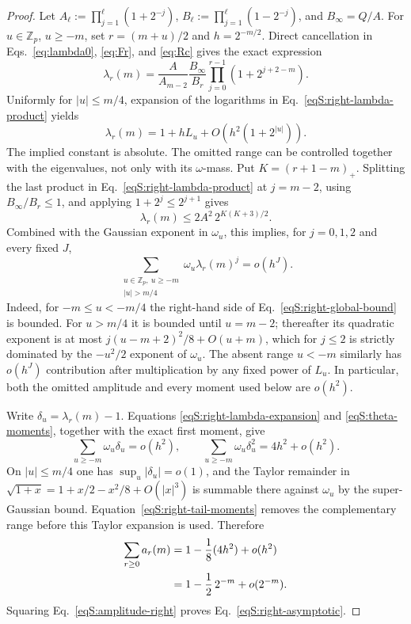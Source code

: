 \documentclass[journal,twocolumn]{IEEEtran}
\theoremstyle{definition}
\theoremstyle{plain}
\begin{document}
\begin{proof}
Let $A_\ell:=\prod_{j=1}^\ell(1+2^{-j})$,
$B_\ell:=\prod_{j=1}^\ell(1-2^{-j})$, and
$B_\infty=Q/A$.  For $u\in\mathbb Z_p$, $u\geq-m$, set
$r=(m+u)/2$ and $h=2^{-m/2}$.  Direct cancellation in
Eqs.~\eqref{eq:lambda0}, \eqref{eq:Fr}, and
\eqref{eq:Rc} gives the exact expression
\begin{equation}
 \lambda_r(m)=
 \frac{A}{A_{m-2}}\frac{B_\infty}{B_r}
 \prod_{j=0}^{r-1}(1+2^{j+2-m}).
 \label{eqS:right-lambda-product}
\end{equation}
Uniformly for $|u|\leq m/4$, expansion of the logarithms in
Eq.~\eqref{eqS:right-lambda-product} yields
\begin{equation}
 \lambda_r(m)=1+hL_u+O\!\left(h^2(1+2^{|u|})\right).
 \label{eqS:right-lambda-expansion}
\end{equation}
The implied constant is absolute.  The omitted range can be controlled
together with the eigenvalues, not only with its $\omega$-mass.  Put
$K=(r+1-m)_+$.  Splitting the last product in
Eq.~\eqref{eqS:right-lambda-product} at $j=m-2$, using
$B_\infty/B_r\leq1$, and applying $1+2^j\leq2^{j+1}$ gives
\begin{equation}
 \lambda_r(m)\leq2A^2\,2^{K(K+3)/2}.
 \label{eqS:right-global-bound}
\end{equation}
Combined with the Gaussian exponent in $\omega_u$, this implies, for
$j=0,1,2$ and every fixed $J$,
\begin{equation}
 \sum_{\substack{u\in\mathbb Z_p,\ u\geq-m\\ |u|>m/4}}
 \omega_u\lambda_r(m)^j=o(h^J).
 \label{eqS:right-tail-moments}
\end{equation}
Indeed, for $-m\leq u<-m/4$ the right-hand side of
Eq.~\eqref{eqS:right-global-bound} is bounded.  For $u>m/4$ it is bounded
until $u=m-2$; thereafter its quadratic exponent is at most
$j(u-m+2)^2/8+O(u+m)$, which for $j\leq2$ is strictly dominated by the
$-u^2/2$ exponent of $\omega_u$.  The absent range $u<-m$ similarly has
$o(h^J)$ contribution after multiplication by any fixed power of $L_u$.
In particular, both the omitted amplitude and every moment used below are
$o(h^2)$.

Write $\delta_u=\lambda_r(m)-1$.  Equations
\eqref{eqS:right-lambda-expansion} and \eqref{eqS:theta-moments}, together
with the exact first moment, give
\begin{equation}
 \sum_{u\geq-m}\omega_u\delta_u=o(h^2),\qquad
 \sum_{u\geq-m}\omega_u\delta_u^2=4h^2+o(h^2).
 \label{eqS:right-delta-moments}
\end{equation}
On $|u|\leq m/4$ one has $\sup_u|\delta_u|=o(1)$, and the Taylor remainder
in $\sqrt{1+x}=1+x/2-x^2/8+O(|x|^3)$ is summable there against
$\omega_u$ by the super-Gaussian bound.  Equation~\eqref{eqS:right-tail-moments}
removes the complementary range before this Taylor expansion is used.
Therefore
\begin{align}
 \sum_{r\geq0}a_r(m)
 &=1-\frac18(4h^2)+o(h^2)\notag\\
 &=1-\frac12\,2^{-m}+o(2^{-m}).
 \label{eqS:amplitude-right}
\end{align}
Squaring Eq.~\eqref{eqS:amplitude-right} proves
Eq.~\eqref{eqS:right-asymptotic}.
\end{proof}
\end{document}
